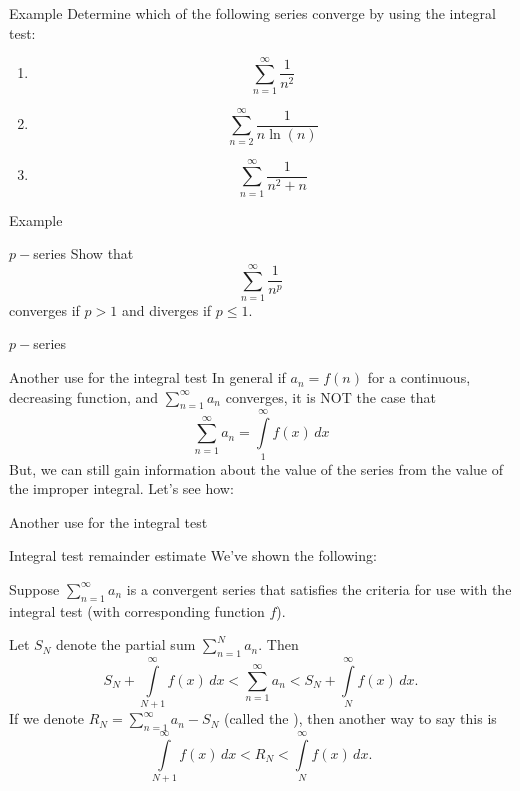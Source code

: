 \documentclass[presentation]{beamer}
\begin{document}
\begin{frame}[label={sec:orgecdf6ba}]{Example}
Determine which of the following series converge by using the integral test:
\begin{enumerate}
\item \[\sum\limits_{n=1}^{\infty} \frac{1}{n^2}\]
\item \[\sum\limits_{n=2}^{\infty} \frac{1}{n\ln(n)}\]
\item \[\sum\limits_{n=1}^{\infty} \frac{1}{n^2 + n}\]
\end{enumerate}
\vspace{10in}
\end{frame}

\begin{frame}[label={sec:org83c1679}]{Example}
\end{frame}

\begin{frame}[label={sec:orga4c0fa3}]{\(p-\)series}
Show that
\[
\sum\limits_{n=1}^{\infty} \frac{1}{n^p}\]
converges if \(p > 1\) and diverges if \(p \le 1.\)
\vspace{10in}
\end{frame}

\begin{frame}[label={sec:org6f629f2}]{\(p-\)series}
\end{frame}

\begin{frame}[label={sec:orgfd85a7f}]{Another use for the integral test}
In general if \(a_n = f(n)\) for a continuous, decreasing function,
and \(\sum\limits_{n=1}^{\infty} a_n\) converges, it is \alert{NOT} the case
that \[ \sum\limits_{n=1}^{\infty} a_n = \int\limits_1^{\infty}
f(x)\,dx\] But, we can still gain information about the value of the
series from the value of the improper integral.  Let's see how:
\vspace{10in}
\end{frame}

\begin{frame}[label={sec:org94d0d7a}]{Another use for the integral test}
\end{frame}

\begin{frame}[label={sec:org3adae89}]{Integral test remainder estimate}
We've shown the following:

Suppose \(\sum\limits_{n=1}^{\infty} a_n\) is a convergent series that satisfies
the criteria for use with the integral test (with corresponding function \(f\)).

Let \(S_N\) denote the partial sum \(\sum\limits_{n=1}^N a_n\). Then
\[
S_N + \int\limits_{N+1}^{\infty} f(x)\,dx < \sum\limits_{n=1}^{\infty}a_n < S_N + \int\limits_N^{\infty} f(x)\,dx. \]
If we denote \(R_N = \sum\limits_{n=1}^{\infty} a_n - S_N\) (called the \uline{\hspace*{1in}}), then another way to say this is
\[
\int\limits_{N+1}^{\infty} f(x)\,dx < R_N < \int\limits_N^{\infty} f(x)\,dx.\]
\end{frame}
\end{document}
